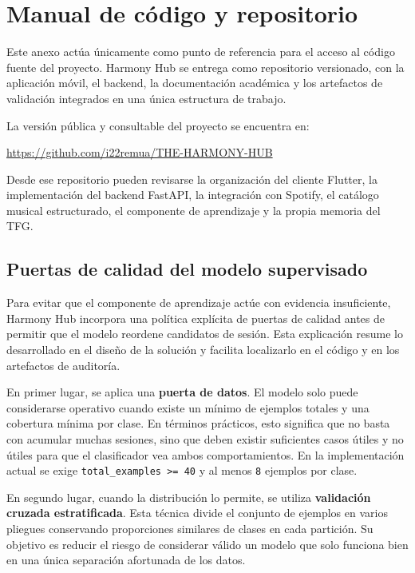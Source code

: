 \chapter{Manual de código y repositorio}
\label{anexo:manual_codigo}

Este anexo actúa únicamente como punto de referencia para el acceso al código
fuente del proyecto. Harmony Hub se entrega como repositorio versionado, con la
aplicación móvil, el backend, la documentación académica y los artefactos de
validación integrados en una única estructura de trabajo.

La versión pública y consultable del proyecto se encuentra en:

\begin{center}
\url{https://github.com/i22remua/THE-HARMONY-HUB}
\end{center}

Desde ese repositorio pueden revisarse la organización del cliente Flutter, la
implementación del backend FastAPI, la integración con Spotify, el catálogo
musical estructurado, el componente de aprendizaje y la propia memoria del
TFG.

\section*{Puertas de calidad del modelo supervisado}

Para evitar que el componente de aprendizaje actúe con evidencia insuficiente,
Harmony Hub incorpora una política explícita de puertas de calidad antes de
permitir que el modelo reordene candidatos de sesión. Esta explicación resume
lo desarrollado en el diseño de la solución y facilita localizarlo en el código
y en los artefactos de auditoría.

En primer lugar, se aplica una \textbf{puerta de datos}. El modelo solo puede
considerarse operativo cuando existe un mínimo de ejemplos totales y una
cobertura mínima por clase. En términos prácticos, esto significa que no basta
con acumular muchas sesiones, sino que deben existir suficientes casos útiles y
no útiles para que el clasificador vea ambos comportamientos. En la
implementación actual se exige \texttt{total\_examples >= 40} y al menos
\texttt{8} ejemplos por clase.

En segundo lugar, cuando la distribución lo permite, se utiliza
\textbf{validación cruzada estratificada}. Esta técnica divide el conjunto de
ejemplos en varios pliegues conservando proporciones similares de clases en
cada partición. Su objetivo es reducir el riesgo de considerar válido un modelo
que solo funciona bien en una única separación afortunada de los datos.

